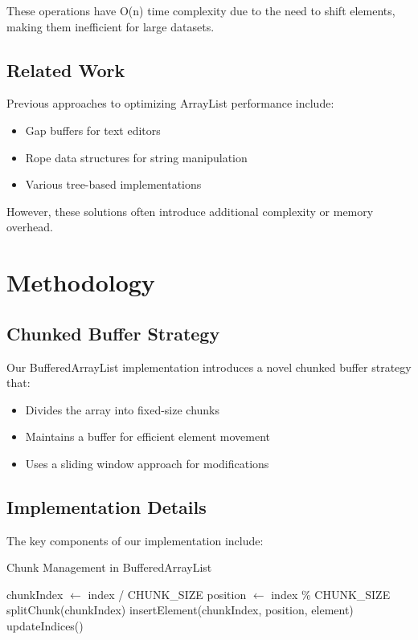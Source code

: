 \documentclass[twocolumn]{article}
\begin{document}
These operations have O(n) time complexity due to the need to shift elements, making them inefficient for large datasets.

\subsection{Related Work}
Previous approaches to optimizing ArrayList performance include:
\begin{itemize}
    \item Gap buffers for text editors
    \item Rope data structures for string manipulation
    \item Various tree-based implementations
\end{itemize}

However, these solutions often introduce additional complexity or memory overhead.

\section{Methodology}
\subsection{Chunked Buffer Strategy}
Our BufferedArrayList implementation introduces a novel chunked buffer strategy that:
\begin{itemize}
    \item Divides the array into fixed-size chunks
    \item Maintains a buffer for efficient element movement
    \item Uses a sliding window approach for modifications
\end{itemize}

\subsection{Implementation Details}
The key components of our implementation include:

\begin{algorithm}[H]
\caption{Chunk Management in BufferedArrayList}
\begin{algpseudocode}
    \State chunkIndex $\gets$ index / CHUNK\_SIZE
    \State position $\gets$ index \% CHUNK\_SIZE
        \State splitChunk(chunkIndex)
    \EndIf
    \State insertElement(chunkIndex, position, element)
    \State updateIndices()
\EndFunction
\end{algpseudocode}
\end{algorithm}
\end{document}

